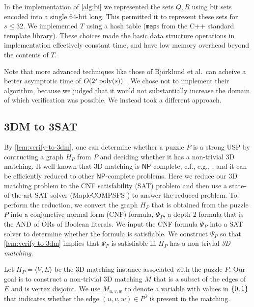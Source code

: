 \documentclass[11pt]{article}
\renewcommand\NP{\ensuremath{\mathsf{NP}}}
\begin{document}
In the implementation of \autoref{alg:bi} we represented the sets
$Q,R$ using bit sets encoded into a single 64-bit long.  This
permitted it to represent these sets for $s \le 32$.  We implemented
$T$ using a hash table (\texttt{map}s from the C++ standard template
library).  These choices made the basic data structure operations in
implementation effectively constant time, and have low memory overhead
beyond the contents of $T$.

Note that more advanced techniques like those of Bj\"{o}rklund et
al.~can acheive a better asymptotic time of $O(2^s\operatorname{poly}(s))$
\cite{bhkk17}.  We chose not to implement their algorithm, because we
judged that it would not substantially increase the domain of which
verification was possible.  We instead took a different approach.

\newpage
\subsection{3DM to 3SAT}
\label{subsec:sat}

By \autoref{lem:verify-to-3dm}, one can determine whether a puzzle $P$
is a strong USP by contructing a graph $H_P$ from $P$ and deciding
whether it has a non-trivial 3D matching.  It well-known that 3D
matching is \NP{}-complete, c.f., e.g., \cite{gj79}, and it can be
efficiently reduced to other \NP{}-complete problems. Here we reduce
our 3D matching problem to the CNF satisfability (SAT) problem and
then use a state-of-the-art SAT solver (MapleCOMPSPS \cite{lgpc16}) to
answer the reduced problem. To perform the reduction, we convert the
graph $H_P$ that is obtained from the puzzle $P$ into a conjunctive
normal form (CNF) formula, $\Psi_P$, a depth-2 formula that is the AND
of ORs of Boolean literals.  We input the CNF formula $\Psi_P$ into a
SAT solver to determine whether the formula is satisfiable.  We
construct $\Psi_P$ so that \autoref{lem:verify-to-3dm} implies that
$\Psi_P$ is satisfiable iff $H_P$ has a non-trivial \emph{3D
  matching}.

Let $H_P = \langle V, E \rangle$ be the 3D matching instance
associated with the puzzle $P$.  Our goal is to construct a
non-trivial 3D matching $M$ that is a subset of the edges of $E$ and
is vertex disjoint.  We use $M_{u,v,w}$ to denote a variable with
values in $\left\{ 0,1 \right\}$ that indicates whether the edge $(u,v,w) \in
P^3$ is present in the matching.
\end{document}
